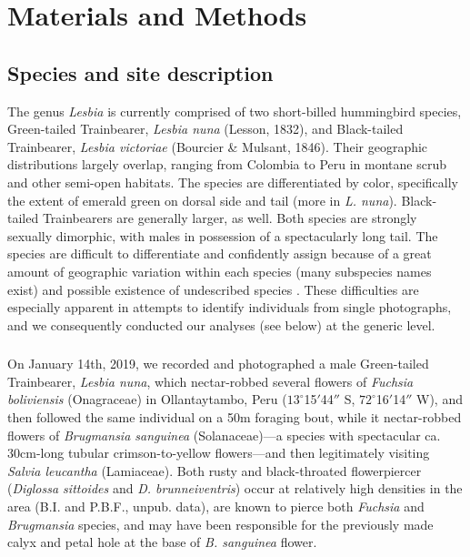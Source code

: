 \documentclass[fleqn,10pt,lineno]{wlpeerj}
\providecommand{\DIFaddtex}[1]{{\protect\color{blue}\uwave{#1}}} %
\providecommand{\DIFaddbegin}{} %
\providecommand{\DIFaddend}{} %
\providecommand{\DIFadd}[1]{\texorpdfstring{\DIFaddtex{#1}}{#1}} %
\begin{document}
\section*{Materials and Methods}

\subsection*{Species and site description}

The genus \textit{Lesbia} is currently comprised of two short-billed hummingbird species, Green-tailed Trainbearer, \textit{Lesbia nuna} (Lesson, 1832), and Black-tailed Trainbearer, \textit{Lesbia victoriae} (Bourcier \& Mulsant, 1846). 
Their geographic distributions largely overlap, ranging from Colombia to Peru in montane scrub and other semi-open habitats. 
The species are differentiated by color, specifically the extent of emerald green on dorsal side and tail (more in \textit{L. nuna}). 
Black-tailed Trainbearers are generally larger, as well. 
Both species are strongly sexually dimorphic, with males in possession of a spectacularly long tail.
The species are difficult to differentiate and confidently assign because of a great amount of geographic variation within each species (many subspecies names exist) and possible existence of undescribed species \citep{weller2004,stiles2004}. %
These difficulties are especially apparent in attempts to identify individuals from single photographs, and we consequently conducted our analyses (see below) at the generic level.

\DIFaddbegin \subsubsection*{\DIFadd{Description of original observation}} %

\DIFaddend On January 14th, 2019, we recorded and photographed a male Green-tailed Trainbearer, \textit{Lesbia nuna}, which nectar-robbed several flowers of \textit{Fuchsia boliviensis} (Onagraceae) in Ollantaytambo, Peru ($13^{\circ}$15$'$44$''$ S, $72^{\circ}$16$'$14$''$ W), and then followed the same individual on a 50m foraging bout, while it nectar-robbed flowers of \textit{Brugmansia sanguinea} (Solanaceae)---a species with spectacular ca. 30cm-long tubular crimson-to-yellow flowers---and then legitimately visiting \textit{Salvia leucantha} (Lamiaceae). Both rusty and black-throated flowerpiercer (\textit{Diglossa sittoides} and \textit{D. brunneiventris}) occur at relatively high densities in the area (B.I. and P.B.F., unpub. data), are known to pierce both \textit{Fuchsia} and \textit{Brugmansia} species, and may have been responsible for the previously made calyx and petal hole at the base of \textit{B. sanguinea} flower.
\end{document}
